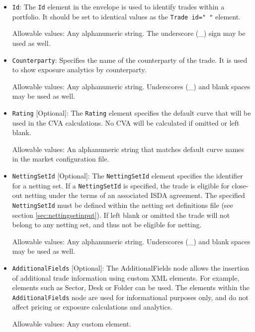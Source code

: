 \begin{itemize}
\item {\tt Id}: The {\tt Id} element in the envelope is used to identify trades within a portfolio. It should be set to
  identical values as the {\tt Trade id=" "} element.

  Allowable values: Any alphanumeric string. The underscore (\_) sign may be used as well.

%

\item {\tt Counterparty}: Specifies the name of the counterparty of the trade.  It is used to show exposure analytics by
  counterparty.

Allowable values: Any alphanumeric string. Underscores (\_) and blank spaces may be used as well. 

\item {\tt Rating} [Optional]: The {\tt Rating} element specifies the default curve that will be used in the CVA
  calculations.  No CVA will be calculated if omitted or left blank.

Allowable values: An alphanumeric string that matches default curve names in the market configuration file.  

\item {\tt NettingSetId} [Optional]: The {\tt NettingSetId} element specifies the identifier for a netting set. If a
  \lstinline!NettingSetId! is specified, the trade is eligible for close-out netting under the terms of an associated
  ISDA agreement. The specified {\tt NettingSetId} must be defined within the netting set definitions file
  (see section \ref{sec:nettingsetinput}). If left blank or omitted the trade will not belong to any netting set, and thus not be
  eligible for netting.

Allowable values: Any alphanumeric string. Underscores (\_) and blank spaces may be used as well. 


\item \lstinline!AdditionalFields! [Optional]: The AdditionalFields node allows the insertion of additional trade
  information using custom XML elements.  For example, elements such as Sector, Desk or Folder can be used. The elements
  within the \lstinline!AdditionalFields! node are used for informational purposes only, and do not affect pricing or
  exposure calculations and analytics.

Allowable values: Any custom element.

\end{itemize}

